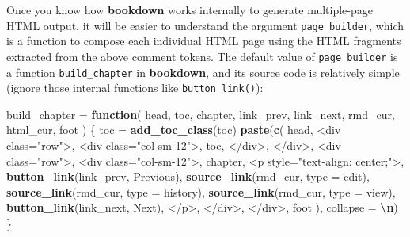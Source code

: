 \documentclass[
  12pt,
]{krantz}
\newenvironment{Shaded}{\begin{snugshade}}{\end{snugshade}}
\newcommand{\AttributeTok}[1]{\textcolor[rgb]{0.13,0.29,0.53}{#1}}
\newcommand{\ControlFlowTok}[1]{\textcolor[rgb]{0.13,0.29,0.53}{\textbf{#1}}}
\newcommand{\FunctionTok}[1]{\textcolor[rgb]{0.13,0.29,0.53}{\textbf{#1}}}
\newcommand{\NormalTok}[1]{#1}
\newcommand{\OtherTok}[1]{\textcolor[rgb]{0.56,0.35,0.01}{#1}}
\newcommand{\SpecialCharTok}[1]{\textcolor[rgb]{0.81,0.36,0.00}{\textbf{#1}}}
\newcommand{\StringTok}[1]{\textcolor[rgb]{0.31,0.60,0.02}{#1}}
\theoremstyle{definition}
\theoremstyle{definition}
\theoremstyle{definition}
\theoremstyle{definition}
\theoremstyle{remark}
\begin{document}
Once you know how \textbf{bookdown} works internally to generate multiple-page HTML output, it will be easier to understand the argument \texttt{page\_builder}, which is a function to compose each individual HTML page using the HTML fragments extracted from the above comment tokens. The default value of \texttt{page\_builder} is a function \texttt{build\_chapter} in \textbf{bookdown}, and its source code is relatively simple (ignore those internal functions like \texttt{button\_link()}):

\begin{Shaded}
\begin{Highlighting}[]
\NormalTok{build\_chapter }\OtherTok{=} \ControlFlowTok{function}\NormalTok{(}
\NormalTok{  head, toc, chapter, link\_prev, link\_next, rmd\_cur, html\_cur, foot}
\NormalTok{) \{}
\NormalTok{  toc }\OtherTok{=} \FunctionTok{add\_toc\_class}\NormalTok{(toc)}
  \FunctionTok{paste}\NormalTok{(}\FunctionTok{c}\NormalTok{(}
\NormalTok{    head,}
    \StringTok{\textquotesingle{}\textless{}div class="row"\textgreater{}\textquotesingle{}}\NormalTok{,}
    \StringTok{\textquotesingle{}\textless{}div class="col{-}sm{-}12"\textgreater{}\textquotesingle{}}\NormalTok{,}
\NormalTok{    toc,}
    \StringTok{\textquotesingle{}\textless{}/div\textgreater{}\textquotesingle{}}\NormalTok{,}
    \StringTok{\textquotesingle{}\textless{}/div\textgreater{}\textquotesingle{}}\NormalTok{,}
    \StringTok{\textquotesingle{}\textless{}div class="row"\textgreater{}\textquotesingle{}}\NormalTok{,}
    \StringTok{\textquotesingle{}\textless{}div class="col{-}sm{-}12"\textgreater{}\textquotesingle{}}\NormalTok{,}
\NormalTok{    chapter,}
    \StringTok{\textquotesingle{}\textless{}p style="text{-}align: center;"\textgreater{}\textquotesingle{}}\NormalTok{,}
    \FunctionTok{button\_link}\NormalTok{(link\_prev, }\StringTok{\textquotesingle{}Previous\textquotesingle{}}\NormalTok{),}
    \FunctionTok{source\_link}\NormalTok{(rmd\_cur, }\AttributeTok{type =} \StringTok{\textquotesingle{}edit\textquotesingle{}}\NormalTok{),}
    \FunctionTok{source\_link}\NormalTok{(rmd\_cur, }\AttributeTok{type =} \StringTok{\textquotesingle{}history\textquotesingle{}}\NormalTok{),}
    \FunctionTok{source\_link}\NormalTok{(rmd\_cur, }\AttributeTok{type =} \StringTok{\textquotesingle{}view\textquotesingle{}}\NormalTok{),}
    \FunctionTok{button\_link}\NormalTok{(link\_next, }\StringTok{\textquotesingle{}Next\textquotesingle{}}\NormalTok{),}
    \StringTok{\textquotesingle{}\textless{}/p\textgreater{}\textquotesingle{}}\NormalTok{,}
    \StringTok{\textquotesingle{}\textless{}/div\textgreater{}\textquotesingle{}}\NormalTok{,}
    \StringTok{\textquotesingle{}\textless{}/div\textgreater{}\textquotesingle{}}\NormalTok{,}
\NormalTok{    foot}
\NormalTok{  ), }\AttributeTok{collapse =} \StringTok{\textquotesingle{}}\SpecialCharTok{\textbackslash{}n}\StringTok{\textquotesingle{}}\NormalTok{)}
\NormalTok{\}}
\end{Highlighting}
\end{Shaded}
\end{document}
